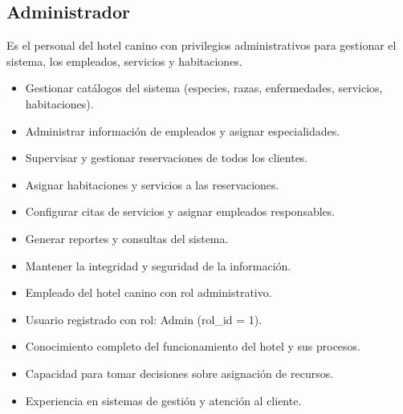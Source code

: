 \begin{Usuario}{\hypertarget{Administrador}{\subsection{Administrador}}}{
	Es el personal del hotel canino con privilegios administrativos para gestionar el sistema, los empleados, servicios y habitaciones.
}
    \item[Responsabilidades:] \cdtEmpty
    \begin{itemize}
		\item Gestionar catálogos del sistema (especies, razas, enfermedades, servicios, habitaciones).
		\item Administrar información de empleados y asignar especialidades.
		\item Supervisar y gestionar reservaciones de todos los clientes.
		\item Asignar habitaciones y servicios a las reservaciones.
		\item Configurar citas de servicios y asignar empleados responsables.
		\item Generar reportes y consultas del sistema.
		\item Mantener la integridad y seguridad de la información.
    \end{itemize}

	\item[Perfil:] \cdtEmpty
    \begin{itemize}
		\item Empleado del hotel canino con rol administrativo.
		\item Usuario registrado con rol: Admin (rol\_id = 1).
		\item Conocimiento completo del funcionamiento del hotel y sus procesos.
		\item Capacidad para tomar decisiones sobre asignación de recursos.
		\item Experiencia en sistemas de gestión y atención al cliente.
    \end{itemize}
\end{Usuario}

